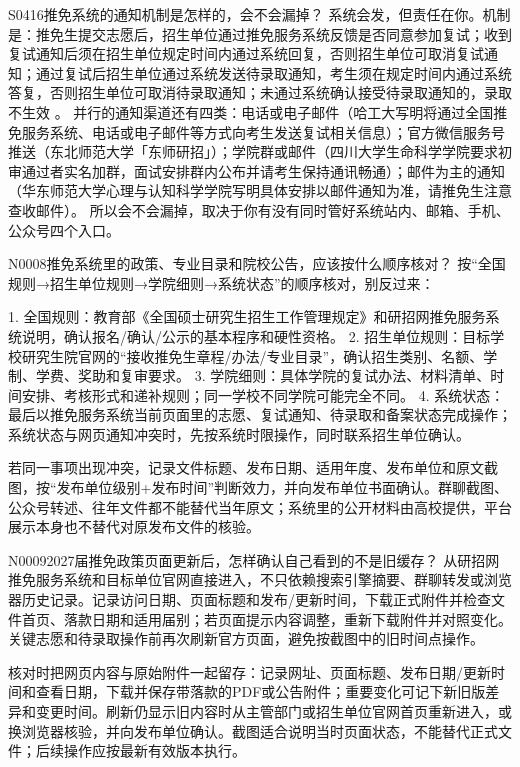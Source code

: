 \begin{qa}{S0416}{推免系统的通知机制是怎样的，会不会漏掉？}
系统会发，但责任在你。机制是：推免生提交志愿后，招生单位通过推免服务系统反馈是否同意参加复试；收到复试通知后须在招生单位规定时间内通过系统回复，否则招生单位可取消复试通知；通过复试后招生单位通过系统发送待录取通知，考生须在规定时间内通过系统答复，否则招生单位可取消待录取通知；未通过系统确认接受待录取通知的，录取不生效 。
并行的通知渠道还有四类：电话或电子邮件（哈工大写明将通过全国推免服务系统、电话或电子邮件等方式向考生发送复试相关信息）；官方微信服务号推送（东北师范大学「东师研招」）；学院群或邮件（四川大学生命科学学院要求初审通过者实名加群，面试安排群内公布并请考生保持通讯畅通）；邮件为主的通知（华东师范大学心理与认知科学学院写明具体安排以邮件通知为准，请推免生注意查收邮件）。
所以会不会漏掉，取决于你有没有同时管好系统站内、邮箱、手机、公众号四个入口。
\end{qa}


\begin{qa}{N0008}{推免系统里的政策、专业目录和院校公告，应该按什么顺序核对？}
按“全国规则→招生单位规则→学院细则→系统状态”的顺序核对，别反过来：

1. 全国规则：教育部《全国硕士研究生招生工作管理规定》和研招网推免服务系统说明，确认报名/确认/公示的基本程序和硬性资格。
2. 招生单位规则：目标学校研究生院官网的“接收推免生章程/办法/专业目录”，确认招生类别、名额、学制、学费、奖助和复审要求。
3. 学院细则：具体学院的复试办法、材料清单、时间安排、考核形式和递补规则；同一学校不同学院可能完全不同。
4. 系统状态：最后以推免服务系统当前页面里的志愿、复试通知、待录取和备案状态完成操作；系统状态与网页通知冲突时，先按系统时限操作，同时联系招生单位确认。

若同一事项出现冲突，记录文件标题、发布日期、适用年度、发布单位和原文截图，按“发布单位级别+发布时间”判断效力，并向发布单位书面确认。群聊截图、公众号转述、往年文件都不能替代当年原文；系统里的公开材料由高校提供，平台展示本身也不替代对原发布文件的核验。
\end{qa}

\begin{qa}{N0009}{2027届推免政策页面更新后，怎样确认自己看到的不是旧缓存？}
从研招网推免服务系统和目标单位官网直接进入，不只依赖搜索引擎摘要、群聊转发或浏览器历史记录。记录访问日期、页面标题和发布/更新时间，下载正式附件并检查文件首页、落款日期和适用届别；若页面提示内容调整，重新下载附件并对照变化。关键志愿和待录取操作前再次刷新官方页面，避免按截图中的旧时间点操作。

核对时把网页内容与原始附件一起留存：记录网址、页面标题、发布日期/更新时间和查看日期，下载并保存带落款的PDF或公告附件；重要变化可记下新旧版差异和变更时间。刷新仍显示旧内容时从主管部门或招生单位官网首页重新进入，或换浏览器核验，并向发布单位确认。截图适合说明当时页面状态，不能替代正式文件；后续操作应按最新有效版本执行。
\end{qa}

